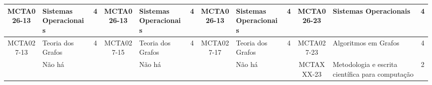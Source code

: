 \documentclass[a4paper]{article}
\begin{document}
\begin{landscape}
{\begin{longtable}{|c|p{.2\textheight}|c||c|p{.2\textheight}|c||c|p{.2\textheight}|c||c|p{.2\textheight}|c|}
    MCTA026-13 & Sistemas Operacionais & 4 & 
    MCTA026-13 & Sistemas Operacionais & 4 & 
    MCTA026-13 & Sistemas Operacionais & 4 & 
    MCTA026-23 & Sistemas Operacionais & 4 \\ \hline

    MCTA027-13 & Teoria dos Grafos & 4 &
    MCTA027-15 & Teoria dos Grafos & 4 &
    MCTA027-17 & Teoria dos Grafos & 4 &
    MCTA027-23 & Algoritmos em Grafos & 4 \\ \hline

    & Não há & &
    & Não há & & 
    & Não há & & 
    MCTAXXX-23 & Metodologia e escrita científica para computação & 2 \\ \hline

\end{longtable}
}
\end{landscape}
\end{document}
